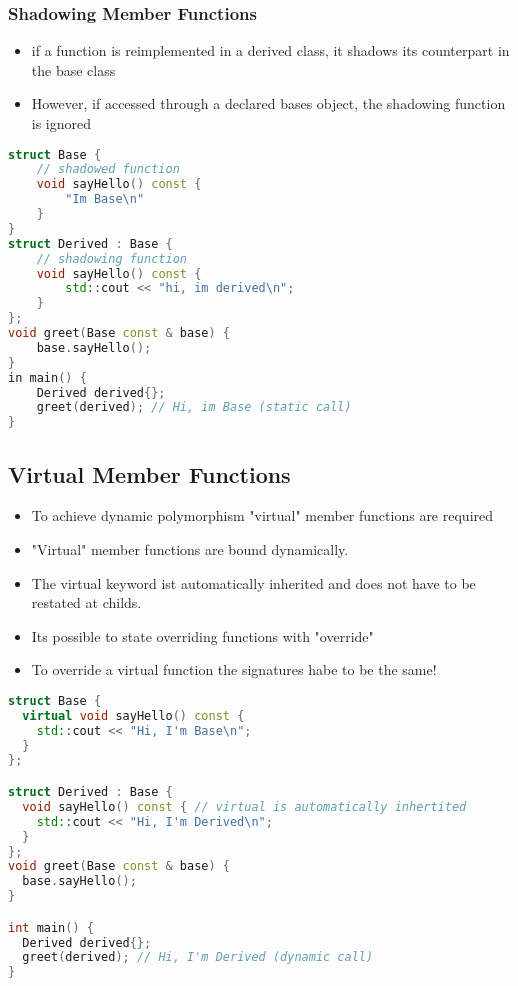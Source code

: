 \subsubsection{Shadowing Member Functions}
\begin{itemize}
  \itemsep -0.5em 
  \item if a function is reimplemented in a derived class, it shadows its counterpart in the base class
  \item However, if accessed through a declared bases object, the shadowing function is ignored
\end{itemize}

\begin{lstlisting}[language=C++]
struct Base {
	// shadowed function 
	void sayHello() const {
		"Im Base\n"
	}
}
struct Derived : Base {
	// shadowing function
	void sayHello() const {
		std::cout << "hi, im derived\n";
	}
};
void greet(Base const & base) {
	base.sayHello(); 
}
in main() {
	Derived derived{};
	greet(derived); // Hi, im Base (static call)
}
\end{lstlisting}

\subsection{Virtual Member Functions}
\begin{itemize}
  \itemsep -0.5em 
  \item To achieve dynamic polymorphism "virtual" member functions are required
  \item "Virtual" member functions are bound dynamically.
  \item The virtual keyword ist automatically inherited and does not have to be restated at childs.
  \item Its possible to state overriding functions with "override"
  \item To override a virtual function the signatures habe to be the same!
\end{itemize}

\begin{lstlisting}[language=C++]
struct Base {
  virtual void sayHello() const {
    std::cout << "Hi, I'm Base\n";
  }
};

struct Derived : Base {
  void sayHello() const { // virtual is automatically inhertited
    std::cout << "Hi, I'm Derived\n";
  }
};
void greet(Base const & base) {
  base.sayHello();
}

int main() {
  Derived derived{};
  greet(derived); // Hi, I'm Derived (dynamic call)
}
\end{lstlisting}

